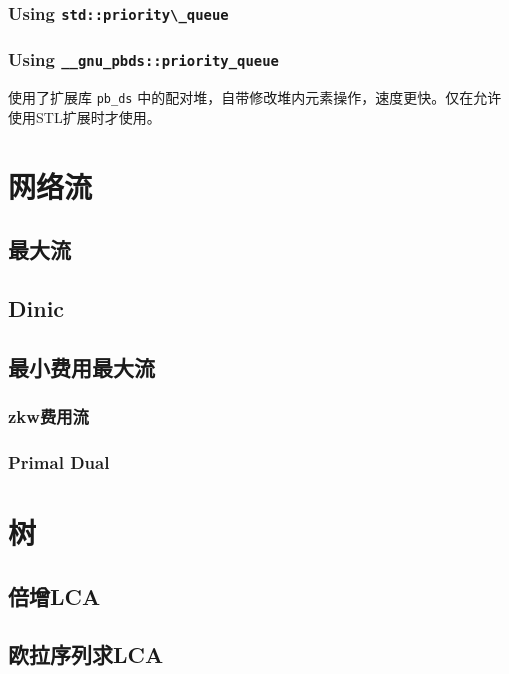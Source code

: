 \documentclass{article}
\begin{document}
			\subsubsection{Using \lstinline|std::priority\_queue|}
			
			\subsubsection{Using \lstinline|__gnu_pbds::priority_queue|}
			使用了扩展库 \lstinline|pb_ds| 中的配对堆，自带修改堆内元素操作，速度更快。仅在允许使用STL扩展时才使用。
			
	\section{网络流}
		\subsection{最大流}
			\subsection{Dinic}
			

		\subsection{最小费用最大流}
			\subsubsection{zkw费用流}
			
			\subsubsection{Primal Dual}
			
	\newpage

	\section{树}
		\subsection{倍增LCA}
		
		\subsection{欧拉序列求LCA}
		
\end{document}
